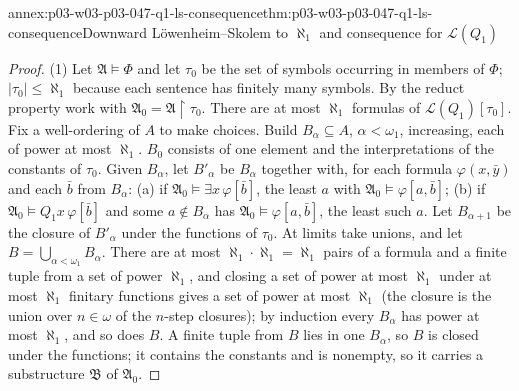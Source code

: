 \begin{annexitem}{annex:p03-w03-p03-047-q1-ls-consequence}{thm:p03-w03-p03-047-q1-ls-consequence}{Downward L\"owenheim--Skolem to \(\aleph_1\) and consequence for \(\mathscr L(Q_1)\)}
\begin{proof}
(1) Let \(\mathfrak A\models\Phi\) and let \(\tau_0\) be the set of symbols
occurring in members of \(\Phi\); \(|\tau_0|\le\aleph_1\) because each
sentence has finitely many symbols.  By the reduct property work with
\(\mathfrak A_0=\mathfrak A\restriction\tau_0\).  There are at most
\(\aleph_1\) formulas of \(\mathscr L(Q_1)[\tau_0]\).  Fix a well-ordering of
\(A\) to make choices.  Build \(B_\alpha\subseteq A\), \(\alpha<\omega_1\),
increasing, each of power at most \(\aleph_1\).  \(B_0\) consists of one
element and the interpretations of the constants of \(\tau_0\).  Given
\(B_\alpha\), let \(B'_\alpha\) be \(B_\alpha\) together with, for each
formula \(\varphi(x,\bar y)\) and each \(\bar b\) from \(B_\alpha\):
(a) if \(\mathfrak A_0\models\exists x\,\varphi[\bar b]\), the least
\(a\) with \(\mathfrak A_0\models\varphi[a,\bar b]\); (b) if
\(\mathfrak A_0\models Q_1x\,\varphi[\bar b]\) and some \(a\notin B_\alpha\)
has \(\mathfrak A_0\models\varphi[a,\bar b]\), the least such \(a\).  Let
\(B_{\alpha+1}\) be the closure of \(B'_\alpha\) under the functions of
\(\tau_0\).  At limits take unions, and let \(B=\bigcup_{\alpha<\omega_1}B_\alpha\).
There are at most \(\aleph_1\cdot\aleph_1=\aleph_1\) pairs of a formula and a
finite tuple from a set of power \(\aleph_1\), and closing a set of power at
most \(\aleph_1\) under at most \(\aleph_1\) finitary functions gives a set of
power at most \(\aleph_1\) (the closure is the union over \(n\in\omega\) of the
\(n\)-step closures); by induction every \(B_\alpha\) has power at most
\(\aleph_1\), and so does \(B\).  A finite tuple from \(B\) lies in one
\(B_\alpha\), so \(B\) is closed under the functions; it contains the
constants and is nonempty, so it carries a substructure \(\mathfrak B\) of
\(\mathfrak A_0\).


\end{proof}
\end{annexitem}
